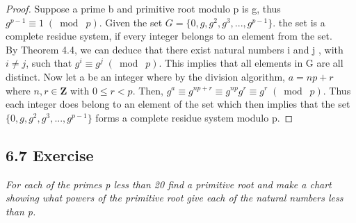 \documentclass{article}
\begin{document}
\begin{proof}
Suppose a prime b and primitive root modulo p is g, thus $g^{p-1} \equiv 1 \;(\bmod\; p)$. Given the set $G = \{0, g, g^2, g^3,...,g^{p-1}\}$. the set is a complete residue system, if every integer belongs to an element from the set.\\
By Theorem 4.4, we can deduce that there exist natural numbers i and j , with $i \neq j$, such that $g^i \equiv g^j \;(\bmod\; p)$. This implies that all elements in G are all distinct. Now let a be an integer where by the division algorithm, $a = np + r$ where $n,r \in \mathbf{Z}$ with $0 \leq r < p$. Then, $g^a \equiv g^{np+r} \equiv g^{np}g^r \equiv g^r \;(\bmod\; p)$. Thus each integer does belong to an element of the set which then implies that the set $\{0, g, g^2, g^3,...,g^{p-1}\}$ forms a complete residue system modulo p.
\end{proof}

\subsection*{6.7 Exercise} 
\quad \textit{For each of the primes p less than 20 find a primitive root and make a chart showing what powers of the primitive root give each of the natural numbers less than p.}
\end{document}
